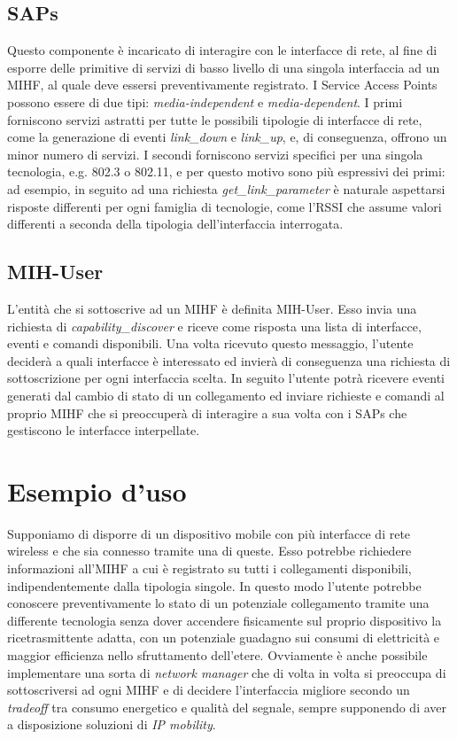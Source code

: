\subsection{SAPs}
Questo componente è incaricato di interagire con le interfacce di rete, al fine di esporre delle primitive di servizi di basso livello di una singola interfaccia ad un MIHF, al quale deve essersi preventivamente registrato.
I Service Access Points possono essere di due tipi: {\em media-independent} e {\em media-dependent}.
I primi forniscono servizi astratti per tutte le possibili tipologie di interfacce di rete, come la generazione di eventi {\em link\_down} e {\em link\_up}, e, di conseguenza, offrono un minor numero di servizi.
I secondi forniscono servizi specifici per una singola tecnologia, e.g. 802.3 o 802.11, e per questo motivo sono più espressivi dei primi: ad esempio, in seguito ad una richiesta {\em get\_link\_parameter} è naturale aspettarsi risposte differenti per ogni famiglia di tecnologie, come l'RSSI che assume valori differenti a seconda della tipologia dell'interfaccia interrogata. 

\subsection{MIH-User}
L'entità che si sottoscrive ad un MIHF è definita MIH-User. Esso invia una richiesta di {\em capability\_discover} e riceve come risposta una lista di interfacce, eventi e comandi disponibili. Una volta ricevuto questo messaggio, l'utente deciderà a quali interfacce è interessato ed invierà di conseguenza una richiesta di sottoscrizione per ogni interfaccia scelta. In seguito l'utente potrà ricevere eventi generati dal cambio di stato di un collegamento ed inviare richieste e comandi al proprio MIHF che si preoccuperà di interagire a sua volta con i SAPs che gestiscono le interfacce interpellate.

\section{Esempio d'uso}
Supponiamo di disporre di un dispositivo mobile con più interfacce di rete wireless e che sia connesso tramite una di queste. Esso potrebbe richiedere informazioni all'MIHF a cui è registrato su tutti i  collegamenti disponibili, indipendentemente dalla tipologia singole. In questo modo l'utente potrebbe conoscere preventivamente lo stato di un potenziale collegamento tramite una differente tecnologia senza dover accendere fisicamente sul proprio dispositivo la ricetrasmittente adatta, con un potenziale guadagno sui consumi di elettricità e maggior efficienza nello sfruttamento dell'etere. Ovviamente è anche possibile implementare una sorta di {\em network manager} che di volta in volta si preoccupa di sottoscriversi ad ogni MIHF e di decidere l'interfaccia migliore secondo un {\em tradeoff} tra consumo energetico e qualità del segnale, sempre supponendo di aver a disposizione soluzioni di {\em IP mobility}.

